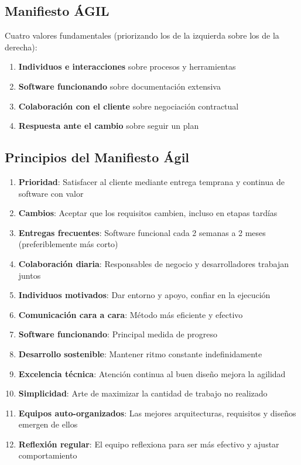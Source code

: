 \documentclass[a4paper,11pt]{report}
\begin{document}
    \subsection{Manifiesto ÁGIL}\label{subsec:manifiesto-agil}

    Cuatro valores fundamentales (priorizando los de la izquierda sobre los de la derecha):

    \begin{enumerate}
        \item \textbf{Individuos e interacciones} sobre procesos y herramientas
        \item \textbf{Software funcionando} sobre documentación extensiva
        \item \textbf{Colaboración con el cliente} sobre negociación contractual
        \item \textbf{Respuesta ante el cambio} sobre seguir un plan
    \end{enumerate}

    \subsection{Principios del Manifiesto Ágil}\label{subsec:principios-del-manifiesto-agil}

    \begin{enumerate}
        \item \textbf{Prioridad}: Satisfacer al cliente mediante entrega temprana y continua de software con valor
        \item \textbf{Cambios}: Aceptar que los requisitos cambien, incluso en etapas tardías
        \item \textbf{Entregas frecuentes}: Software funcional cada 2 semanas a 2 meses (preferiblemente más corto)
        \item \textbf{Colaboración diaria}: Responsables de negocio y desarrolladores trabajan juntos
        \item \textbf{Individuos motivados}: Dar entorno y apoyo, confiar en la ejecución
        \item \textbf{Comunicación cara a cara}: Método más eficiente y efectivo
        \item \textbf{Software funcionando}: Principal medida de progreso
        \item \textbf{Desarrollo sostenible}: Mantener ritmo constante indefinidamente
        \item \textbf{Excelencia técnica}: Atención continua al buen diseño mejora la agilidad
        \item \textbf{Simplicidad}: Arte de maximizar la cantidad de trabajo no realizado
        \item \textbf{Equipos auto-organizados}: Las mejores arquitecturas, requisitos y diseños emergen de ellos
        \item \textbf{Reflexión regular}: El equipo reflexiona para ser más efectivo y ajustar comportamiento
    \end{enumerate}
\end{document}
